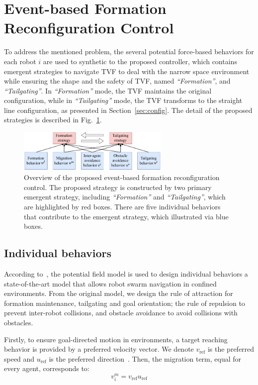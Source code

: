 \section{Event-based Formation Reconfiguration Control}\label{sec3}

To address the mentioned problem, the several potential force-based behaviors for each robot $i$ are used to synthetic to the proposed controller, which contains emergent strategies to navigate TVF to deal with the narrow space environment while ensuring the shape and the safety of TVF, named \textit{``Formation''}, and \textit{``Tailgating''}. In \textit{``Formation''} mode, the TVF maintains the original configuration, while in \textit{``Tailgating''} mode, the TVF transforms to the straight line configuration, as presented in Section~\ref{sec:config}. The detail of the proposed strategies is described in Fig.~\ref{fig:1control_diagram}.

\begin{figure}
    \centering
    \includegraphics[width=0.65\textwidth]{paper2/images/control_diagram.pdf}
    \caption{Overview of the proposed event-based formation reconfiguration control. The proposed strategy is constructed by two primary emergent strategy, including \textit{``Formation''} and \textit{``Tailgating''}, which are highlighted by red boxes. There are five individual behaviors that contribute to the emergent strategy, which illustrated via blue boxes.}
    \label{fig:1control_diagram}
\end{figure}

\subsection{Individual behaviors}
According to~\cite{Vsrhelyi2018}, the potential field model is used to design individual behaviors a state-of-the-art model that allows robot swarm navigation in confined environments. From the original model, we design the rule of attraction for formation maintenance, tailgating and goal orientation; the rule of repulsion to prevent inter-robot collisions, and obstacle avoidance to avoid collisions with 
obstacles. 

Firstly, to ensure goal-directed motion in environments, a target reaching behavior is provided by a preferred velocity vector. We denote $v_\text{ref}$ is the preferred speed and $u_\text{ref}$ is the preferred direction~\cite{6095129}. Then, the migration term, equal for every agent, corresponds to:
\begin{equation}
    v_i^m=v_\text{ref}u_\text{ref}
\end{equation}

